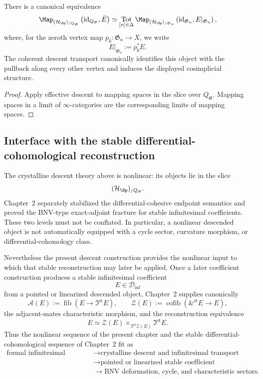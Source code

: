 \begin{proposition}
\label{prop:invariant-sections-totalization}
There is a canonical equivalence
\[
    \Map_{(\mathcal H_{\Sp})_{/Q_{\mathfrak G}}}
    \left(
        \operatorname{id}_{Q_{\mathfrak G}},
        \bar E
    \right)
    \simeq
    \operatorname*{Tot}_{[n]\in\Delta}
    \Map_{(\mathcal H_{\Sp})_{/\mathfrak G_n}}
    \left(
        \operatorname{id}_{\mathfrak G_n},
        E|_{\mathfrak G_n}
    \right),
\]
where, for the zeroth vertex map
$p_0:\mathfrak G_n\to X$, we write
\[
    E|_{\mathfrak G_n}:=p_0^*E.
\]
The coherent descent transport canonically identifies this object with the
pullback along every other vertex and induces the displayed cosimplicial
structure.
\end{proposition}

\begin{proof}
Apply effective descent to mapping spaces in the slice over
$Q_{\mathfrak G}$.  Mapping spaces in a limit of $\infty$-categories are the
corresponding limits of mapping spaces.
\end{proof}

\subsection{Interface with the stable differential-cohomological reconstruction}

The crystalline descent theory above is nonlinear: its objects lie in the slice
\[
    (\mathcal H_{\Sp})_{/Q_{\mathfrak G}}.
\]
Chapter~2 separately stabilized the differential-cohesive endpoint semantics
and proved the BNV-type exact-adjoint fracture for stable infinitesimal
coefficients.  These two levels must not be conflated.  In particular, a
nonlinear descended object is not automatically equipped with a cycle sector,
curvature morphism, or differential-cohomology class.

Nevertheless the present descent construction provides the nonlinear input
to which that stable reconstruction may later be applied.  Once a later
coefficient construction produces a stable infinitesimal coefficient
\[
    E\in\mathcal D_{\inf}
\]
from a pointed or linearized descended object, Chapter~2 supplies canonically
\[
    \mathcal A(E):=\operatorname{fib}(E\to\Im^{\mathrm{st}}E),
    \qquad
    \mathcal Z(E):=\operatorname{cofib}(\&^{\mathrm{st}}E\to E),
\]
the adjacent-mates characteristic morphism, and the reconstruction
equivalence
\[
    E
    \simeq
    \mathcal Z(E)
    \times_{\Im^{\mathrm{st}}\mathcal Z(E)}
    \Im^{\mathrm{st}}E.
\]
Thus the nonlinear sequence of the present chapter and the stable
differential-cohomological sequence of Chapter~2 fit as
\[
\boxed{
\begin{aligned}
\text{formal infinitesimal quotient}
&\longrightarrow
\text{crystalline descent and infinitesimal transport}
\\
&\longrightarrow
\text{pointed or linearized stable coefficient}
\\
&\longrightarrow
\text{BNV deformation, cycle, and characteristic sectors}.
\end{aligned}}
\]

